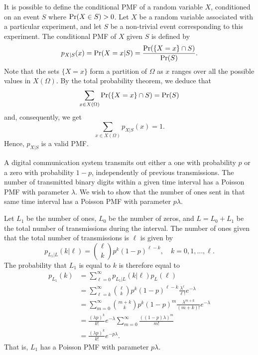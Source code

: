 
It is possible to define the conditional PMF of a random variable $X$, conditioned on an event $S$ where $\Pr (X \in S) > 0$.
Let $X$ be a random variable associated with a particular experiment, and let $S$ be a non-trivial event corresponding to this experiment.
The conditional PMF of $X$ given $S$ is defined by
\begin{equation} \label{equation:ConditionalEventPMF}
p_{X|S} (x) = \Pr (X = x | S)
= \frac{\Pr (\{X = x\} \cap S)}{\Pr (S)} .
\end{equation}
Note that the sets $\{ X = x \}$ form a partition of $\Omega$ as $x$ ranges over all the possible values in $X (\Omega)$.
By the total probability theorem, we deduce that
\begin{equation*}
\sum_{x \in X(\Omega)} \Pr ( \{X = x\} \cap S) = \Pr (S)
\end{equation*}
and, consequently, we get
\begin{equation*}
\sum_{x \in X(\Omega)} p_{X|S} (x) = 1 .
\end{equation*}
Hence, $p_{X|S}$ is a valid PMF.

\begin{example}
A digital communication system transmits out either a one with probability $p$ or a zero with probability $1 - p$, independently of previous transmissions.
The number of transmitted binary digits within a given time interval has a Poisson PMF with parameter $\lambda$.
We wish to show that the number of ones sent in that same time interval has a Poisson PMF with parameter $p \lambda$.

Let $L_1$ be the number of ones, $L_0$ be the number of zeros, and $L = L_0 + L_
1$ be the total number of transmissions during the interval.
The number of ones given that the total number of transmissions is $\ell$ is given by
\begin{equation*}
p_{L_1|L} (k | \ell) = \binom{\ell}{k} p^k (1-p)^{\ell - k},
\quad k = 0, 1, \ldots, \ell.
\end{equation*}
The probability that $L_1$ is equal to $k$ is therefore equal to
\begin{equation*}
\begin{split}
p_{L_1} (k) &= \sum_{\ell = 0}^{\infty} p_{L_1|L} (k | \ell) p_L(\ell) \\
&= \sum_{\ell = k}^{\infty} \binom{\ell}{k} p^k (1-p)^{\ell - k}
\frac{\lambda^{\ell}}{\ell !} e^{-\lambda} \\
&= \sum_{m = 0}^{\infty} \binom{m+k}{k} p^k (1-p)^{m}
\frac{\lambda^{m+k}}{(m+k)!} e^{-\lambda} \\
&= \frac{(\lambda p)^k}{k!} e^{-\lambda}
\sum_{m = 0}^{\infty} \frac{( (1-p) \lambda)^{m}}{m!} \\
&= \frac{(\lambda p)^k}{k!} e^{-p \lambda} .
\end{split}
\end{equation*}
That is, $L_1$ has a Poisson PMF with parameter $p \lambda$.
\end{example}


